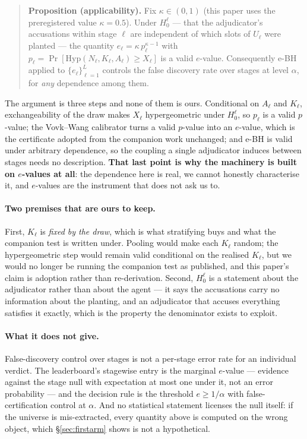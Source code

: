 \documentclass[10pt]{article}
\newcommand{\RM}[1]{{#1}}
\begin{document}
\begin{quote}
\textbf{Proposition (applicability).} Fix $\kappa\in(0,1)$ (this paper uses the
preregistered value $\kappa=\RM{0.5}$). Under $H_0^\ell$ --- that the
adjudicator's accusations within stage $\ell$ are independent of which slots of
$U_\ell$ were planted --- the quantity $e_\ell = \kappa\, p_\ell^{\kappa-1}$
with $p_\ell = \Pr[\mathrm{Hyp}(N_\ell,K_\ell,A_\ell) \ge X_\ell]$ is a valid
$e$-value. Consequently e-BH applied to $\{e_\ell\}_{\ell=1}^{L}$ controls the
false discovery rate over stages at level $\alpha$, for \emph{any} dependence
among them.
\end{quote}

\noindent The argument is three steps and none of them is ours. Conditional on
$A_\ell$ and $K_\ell$, exchangeability of the draw makes $X_\ell$ hypergeometric
under $H_0^\ell$, so $p_\ell$ is a valid $p$-value; the Vovk--Wang calibrator
turns a valid $p$-value into an $e$-value, which is the certificate adopted from
the companion work unchanged; and e-BH is valid under arbitrary dependence, so
the coupling a single adjudicator induces between stages needs no description.
\textbf{That last point is why the machinery is built on $e$-values at all}: the
dependence here is real, we cannot honestly characterise it, and $e$-values are
the instrument that does not ask us to.

\paragraph{Two premises that are ours to keep.} First, $K_\ell$ is
\emph{fixed by the draw}, which is what stratifying buys and what the companion
test is written under. Pooling would make each $K_\ell$ random; the
hypergeometric step would remain valid conditional on the realised $K_\ell$, but
we would no longer be running the companion test as published, and this paper's
claim is adoption rather than re-derivation.
Second, $H_0^\ell$ is a statement about the adjudicator rather than about the
agent --- it says the accusations carry no information about the planting, and
an adjudicator that accuses everything satisfies it exactly, which is the
property the denominator exists to exploit.

\paragraph{What it does not give.} False-discovery control over stages is not a
per-stage error rate for an individual verdict. The leaderboard's stagewise
entry is the marginal $e$-value --- evidence against the stage null with
expectation at most one under it, not an error probability --- and the
decision rule is the threshold $e\ge 1/\alpha$ with false-certification control
at $\alpha$. And no statistical statement
licenses the null itself: if the universe is mis-extracted, every quantity above
is computed on the wrong object, which \S\ref{sec:firstarm} shows is not a
hypothetical.
\end{document}
